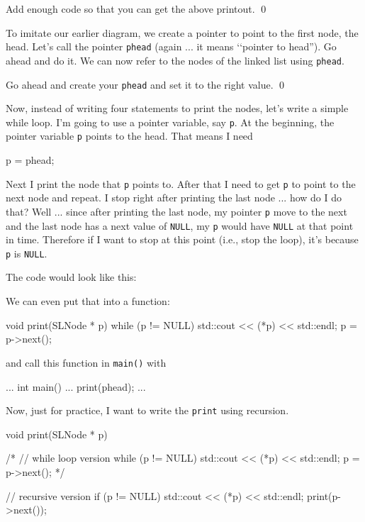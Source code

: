 \begin{ex}
Add enough code so that you can get the above printout.
\qed
\end{ex}

To imitate our earlier diagram, we create a pointer
to point to the first node, the head.
Let's call the pointer \verb!phead! (again ... it means
\lq\lq pointer to head'').
Go ahead and do it.
We can now refer to the nodes of the linked list using
\verb!phead!.

\begin{ex}
Go ahead and create your \verb!phead! and set it to the right value.
\qed
\end{ex}

Now, instead of writing four statements to print the nodes,
let's write a simple while loop.
I'm going to use a pointer variable, say \verb!p!.
At the beginning,
the pointer variable \verb!p! points to the head.
That means I need
\begin{console}[fontsize=\footnotesize]
p = phead;
\end{console}
Next I print the node that \verb!p! points to.
After that I need to get \verb!p! to point to the next node
and repeat.
I stop right after printing the last node ... how do I do that?
Well ... since after printing the last node, my pointer \verb!p!
move to the next and the last node has a next value of \verb!NULL!,
my \verb!p! would have \verb!NULL! at that point in time.
Therefore if I want to stop at this point (i.e., stop the loop),
it's because \verb!p! is \verb!NULL!.

The code would look like this:

We can even put that into a function:
\begin{console}[frame=single,fontsize=\footnotesize]
void print(SLNode * p)
{
    while (p != NULL)
    {
        std::cout << (*p) << std::endl;
        p = p->next();
    }
}
\end{console}
and call this function in \verb!main()! with
\begin{console}[fontsize=\footnotesize,frame=single]
...
int main()
{
    ...
    print(phead);
    ...
}
\end{console}
Now, just for practice, I want to write the \verb!print!
using recursion.
\begin{console}[frame=single,fontsize=\footnotesize]
void print(SLNode * p)
{
    /* // while loop version
    while (p != NULL)
    {
        std::cout << (*p) << std::endl;
        p = p->next();
    }
    */

    // recursive version
    if (p != NULL)
    {
        std::cout << (*p) << std::endl;
        print(p->next());
    }
}
\end{console}



